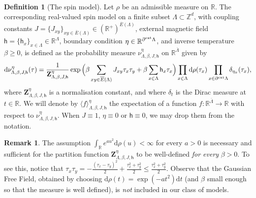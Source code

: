 \documentclass[11pt,a4paper]{article}
\numberwithin{equation}{section}
\theoremstyle{plain}
\theoremstyle{definition}
\newtheorem{Def}[Thm]{Definition}
\newtheorem{Rem}[Thm]{Remark}
\begin{document}
\begin{Def}[The spin model]\label{def:spin models} Let $\rho$ be an admissible measure on $\mathbb{R}$. The corresponding real-valued spin model on a finite subset $\Lambda\subset \mathbb Z^d$, with coupling constants $J=\{J_{xy}\}_{xy\in \overline E(\Lambda)}\in (\mathbb{R}^+)^{\overline E(\Lambda)}$, external magnetic field $\mathsf h=\{\mathsf h_x\}_{x\in \Lambda}\in \mathbb{R}^\Lambda$, boundary condition $\eta\in \mathbb{R}^{\partial^{\textup{ext}}\Lambda}$, and inverse temperature $\beta \geq 0$, is defined as the probability measure $\nu^\eta_{\Lambda,\beta,J,\mathsf h}$ on $\mathbb{R}^{\overline{\Lambda}}$ given by
\begin{multline}
\mathrm{d}\nu^\eta_{\Lambda,\beta,J,\mathsf h}(\tau) = \frac{1}{\mathbf{Z}^\eta_{\Lambda,\beta,J,\mathsf h}} \exp\Big(\beta \sum_{xy\in \overline{E}(\Lambda)} J_{xy} \tau_x \tau_y + \beta \sum_{x\in \Lambda} \mathsf h_x\tau_x  
\Big)\prod_{x\in \Lambda}\mathrm{d}\rho(\tau_x) \prod_{x \in \partial^{\textup{ext}} \Lambda} \delta_{\eta_x}(\tau_x),
\end{multline}
where $\mathbf{Z}^\eta_{\Lambda,\beta,J,\mathsf h}$ is a normalisation constant, and where $\delta_t$ is the Dirac measure at $t\in \mathbb R$. We will denote by $\langle f \rangle^\eta_{\Lambda,\beta,J,\mathsf h}$ the expectation of a function $f:\mathbb{R}^{\overline{\Lambda}}\rightarrow \mathbb R$ with respect to $\nu^\eta_{\Lambda,\beta,J,\mathsf h}$. When $J\equiv 1$, $\eta\equiv 0$ or $\mathsf{h}\equiv 0$, we may drop them from the notation. 
\end{Def}



\begin{Rem}
The assumption $\int_{\mathbb{R}} e^{au^2}\mathrm{d}\rho(u)<\infty$ for every $a>0$ is necessary and sufficient for the partition function $\mathbf{Z}^{\eta}_{\Lambda,\beta,J,\mathsf{h}}$ to be well-defined \emph{for every} $\beta>0$. To see this, notice that 
$
\tau_x\tau_y=-\frac{(\tau_x-\tau_y)^2}{2}+\frac{\tau_x^2+\tau_y^2}{2}\leq \frac{\tau_x^2+\tau_y^2}{2}.
$
Observe that the Gaussian Free Field, obtained by choosing $\mathrm{d}\rho(t)=\exp(-at^2)\mathrm{d}t$ (and $\beta$ small enough so that the measure is well defined), is \emph{not} included in our class of models.
\end{Rem}
\end{document}
